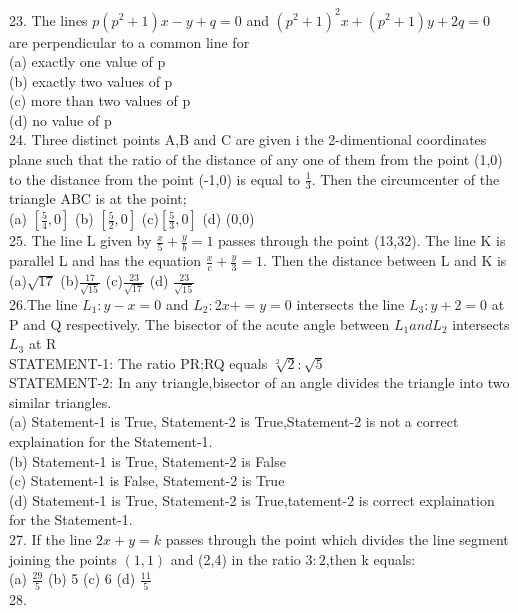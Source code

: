 \documentclass[12pt]{article}
\begin{document}
23. The lines $p(p^2+1)x-y+q=0$ and $(p^2+1)^2x+(p^2+1)y+2q=0$ are perpendicular to a common line for \\
(a) exactly one value of p\\
(b) exactly two values of p\\
(c) more than two values of p\\
(d) no value of p\\
24. Three distinct points A,B and C are given i the 2-dimentional coordinates plane such that the ratio of the  distance of any one of them from the point (1,0) to the distance from the point (-1,0) is equal to $\frac{1}{3}$. Then the circumcenter of the triangle ABC is at the point;\\
(a) $[\frac{5}{4} ,0]$ \hspace{1cm} (b) $[\frac{5}{2} ,0]$ \hspace{1cm} (c)$[\frac{5}{3} ,0] $\hspace{1cm} (d) (0,0)\\
25. The line L given by $\frac{x}{5}+\frac{y}{b}=1$ passes through the point (13,32). The line K is parallel L and has the equation $\frac{x}{c}+\frac{y}{3}=1$. Then the distance between L and K is \\
(a)$\sqrt{17}$  \hspace{1cm} (b)$\frac{17}{\sqrt{15}}$ \hspace{1cm} (c)$\frac{23}{\sqrt{17}}$ \hspace{1cm} (d) $\frac{23}{\sqrt{15}}$\\
 26.The line $L_1:y-x=0$ and $L_2: 2x+=y=0$ intersects the line $L_3: y+2=0$ at P and Q respectively. The bisector of the acute angle between $L_1 and L_2$ intersects $L_3$ at R\\
 STATEMENT-1: The ratio PR;RQ equals $\sqrt[2]{2}:\sqrt{5}$\\
 STATEMENT-2: In any triangle,bisector of an angle divides the triangle into two similar triangles.\\
(a) Statement-1 is True, Statement-2 is True,Statement-2 is not a correct explaination for the Statement-1.\\
(b) Statement-1 is True, Statement-2 is False\\
(c) Statement-1 is False, Statement-2 is True\\
(d) Statement-1 is True, Statement-2 is True,tatement-2 is correct explaination for the Statement-1.\\
27. If the line $2x +y=k$ passes through the point which divides the line segment joining the points $(1,1)$ and (2,4) in the ratio $3:2$,then k equals:\\
(a) $\frac{29}{5}$ \hspace{1cm} (b) 5 \hspace{1cm} (c) 6 \hspace{1cm} (d) $\frac{11}{5}$\\
28. 







 
\end{document}
